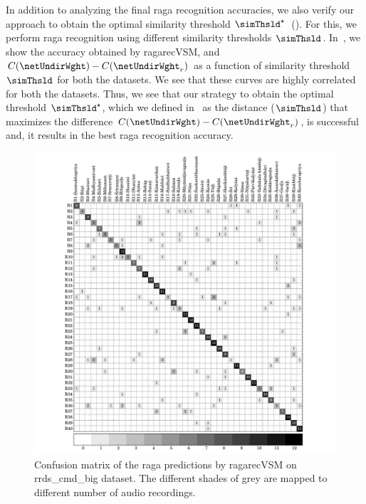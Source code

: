 In addition to analyzing the final \gls{raga} recognition accuracies, we also verify our approach to obtain the optimal similarity threshold $\simThsld^\star$~(). For this, we perform \gls{raga} recognition using different similarity thresholds $\simThsld$. In~, we show the accuracy obtained by \acrshort{ragarecVSM}, and  $C(\netUndirWght)-C(\netUndirWght_r)$ as a function of similarity threshold $\simThsld$ for both the datasets. We see that these curves are highly correlated for both the datasets. Thus, we see that our strategy to obtain the optimal threshold $\simThsld^\star$, which we defined in~ as the distance ($\simThsld$) that maximizes the difference $C(\netUndirWght)-C(\netUndirWght_r)$, is successful and, it results in the best \gls{raga} recognition accuracy.

\begin{figure}[h]
	\begin{center}
		\includegraphics[width=\figSizeNinety]{ch07_ragaRecognition/figures/CM_vsm_cmd_var1.pdf}
	\end{center}
	\caption{Confusion matrix of the \gls{raga} predictions by \acrshort{ragarecVSM} on \acrshort{rrds_cmd_big} dataset. The different shades of grey are mapped to different number of audio recordings.}
	\label{fig:confusion_matrix_cmd}
\end{figure}

